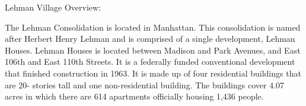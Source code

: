 Lehman Village Overview:     

   

The Lehman Consolidation is located in Manhattan. This consolidation is named after Herbert Henry Lehman and is comprised of a single development, Lehman Houses. Lehman Houses is located between Madison and Park Avenues, and East 106th and East 110th Streets. It is a federally funded conventional development that finished construction in 1963. It is made up of four residential buildings that are 20- stories tall and one non-residential building. The buildings cover 4.07 acres in which there are 614 apartments officially housing 1,436 people.
